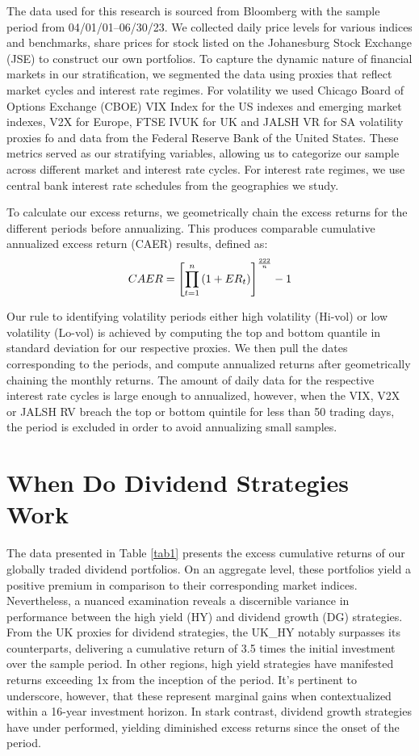 \documentclass[11pt,preprint, authoryear]{elsarticle}
\numberwithin{equation}{section}
\numberwithin{figure}{section}
\numberwithin{table}{section}
\begin{document}
The data used for this research is sourced from Bloomberg with the
sample period from 04/01/01--06/30/23. We collected daily price levels
for various indices and benchmarks, share prices for stock listed on the
Johanesburg Stock Exchange (JSE) to construct our own portfolios. To
capture the dynamic nature of financial markets in our stratification,
we segmented the data using proxies that reflect market cycles and
interest rate regimes. For volatility we used Chicago Board of Options
Exchange (CBOE) VIX Index for the US indexes and emerging market
indexes, V2X for Europe, FTSE IVUK for UK and JALSH VR for SA volatility
proxies fo and data from the Federal Reserve Bank of the United States.
These metrics served as our stratifying variables, allowing us to
categorize our sample across different market and interest rate cycles.
For interest rate regimes, we use central bank interest rate schedules
from the geographies we study.

To calculate our excess returns, we geometrically chain the excess
returns for the different periods before annualizing. This produces
comparable cumulative annualized excess return (CAER) results, defined
as: \begin{align}
C A E R=\left[\prod_{t=1}^n\left(1+E R_t\right)\right]^{\frac{222}{n}}-1 \notag
\end{align}

Our rule to identifying volatility periods either high volatility
(Hi-vol) or low volatility (Lo-vol) is achieved by computing the top and
bottom quantile in standard deviation for our respective proxies. We
then pull the dates corresponding to the periods, and compute annualized
returns after geometrically chaining the monthly returns. The amount of
daily data for the respective interest rate cycles is large enough to
annualized, however, when the VIX, V2X or JALSH RV breach the top or
bottom quintile for less than 50 trading days, the period is excluded in
order to avoid annualizing small samples.

\hypertarget{when-do-dividend-strategies-work}{%
\section{When Do Dividend Strategies
Work}\label{when-do-dividend-strategies-work}}

The data presented in Table \ref{tab1} presents the excess cumulative
returns of our globally traded dividend portfolios. On an aggregate
level, these portfolios yield a positive premium in comparison to their
corresponding market indices. Nevertheless, a nuanced examination
reveals a discernible variance in performance between the high yield
(HY) and dividend growth (DG) strategies. From the UK proxies for
dividend strategies, the UK\_HY notably surpasses its counterparts,
delivering a cumulative return of 3.5 times the initial investment over
the sample period. In other regions, high yield strategies have
manifested returns exceeding 1x from the inception of the period. It's
pertinent to underscore, however, that these represent marginal gains
when contextualized within a 16-year investment horizon. In stark
contrast, dividend growth strategies have under performed, yielding
diminished excess returns since the onset of the period.
\end{document}
